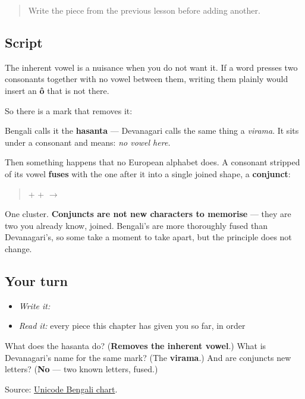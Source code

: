 \begin{quote}
Write the piece from the previous lesson before adding another.
\end{quote}

\subsection*{Script}
The inherent vowel is a nuisance when you do not want it. If a word presses two consonants together with no vowel between them, writing them plainly would insert an \textbf{ô} that is not there.

So there is a mark that removes it:

\begin{quote}
\end{quote}

Bengali calls it the \textbf{hasanta} — Devanagari calls the same thing a \emph{virama}. It sits under a consonant and means: \emph{no vowel here.}

Then something happens that no European alphabet does. A consonant stripped of its vowel \textbf{fuses} with the one after it into a single joined shape, a \textbf{conjunct}:

\begin{quote}
\textbf{} + \textbf{} + \textbf{} $\to$ \textbf{}
\end{quote}

One cluster. \textbf{Conjuncts are not new characters to memorise} — they are two you already know, joined. Bengali's are more thoroughly fused than Devanagari's, so some take a moment to take apart, but the principle does not change.

\subsection*{Your turn}
\begin{itemize}
\raggedright
  \item \emph{Write it:} 
  \item \emph{Read it:} every piece this chapter has given you so far, in order
\end{itemize}

\begin{tcolorbox}[breakable,colback=teal!4,colframe=teal!35!black,title={Before you move on}]
What does the hasanta do? (\textbf{Removes the inherent vowel}.) What is Devanagari's name for the same mark? (The \textbf{virama}.) And are conjuncts new letters? (\textbf{No} — two known letters, fused.)

Source: \href{https://www.unicode.org/charts/PDF/U0980.pdf}{Unicode Bengali chart}.
\end{tcolorbox}
